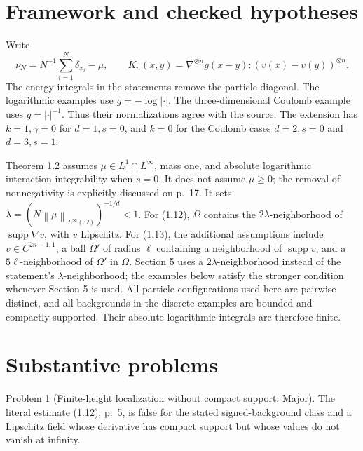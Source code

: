 \documentclass[10pt]{article}
\begin{document}
\section*{Framework and checked hypotheses}
Write \[\nu_N=N^{-1}\sum_{i=1}^N\delta_{x_i}-\mu,\qquad
 K_n(x,y)=\nabla^{\otimes n}g(x-y):(v(x)-v(y))^{\otimes n}.\] The energy integrals in the statements remove the particle diagonal. The logarithmic examples use \(g=-\log|\cdot|\). The three-dimensional Coulomb example uses \(g=|\cdot|^{-1}\). Thus their normalizations agree with the source. The extension has \(k=1,\gamma=0\) for \(d=1,s=0\), and \(k=0\) for the Coulomb cases \(d=2,s=0\) and \(d=3,s=1\).\par
Theorem 1.2 assumes \(\mu\in L^1\cap L^\infty\), mass one, and absolute logarithmic interaction integrability when \(s=0\). It does not assume \(\mu\geq0\); the removal of nonnegativity is explicitly discussed on p. 17. It sets \(\lambda=(N\left\lVert \mu\right\rVert_{L^\infty(\Omega)})^{-1/d}<1\). For (1.12), \(\Omega\) contains the \(2\lambda\)-neighborhood of \(\operatorname{supp}\nabla v\), with \(v\) Lipschitz. For (1.13), the additional assumptions include \(v\in C^{2n-1,1}\), a ball \(\Omega'\) of radius \(\ell\) containing a neighborhood of \(\operatorname{supp}v\), and a \(5\ell\)-neighborhood of \(\Omega'\) in \(\Omega\). Section 5 uses a \(2\lambda\)-neighborhood instead of the statement’s \(\lambda\)-neighborhood; the examples below satisfy the stronger condition whenever Section 5 is used. All particle configurations used here are pairwise distinct, and all backgrounds in the discrete examples are bounded and compactly supported. Their absolute logarithmic integrals are therefore finite.\par
\section*{Substantive problems}
Problem 1 (Finite-height localization without compact support: Major).  The literal estimate (1.12), p. 5, is false for the stated signed-background class and a Lipschitz field whose derivative has compact support but whose values do not vanish at infinity.\par
\end{document}
